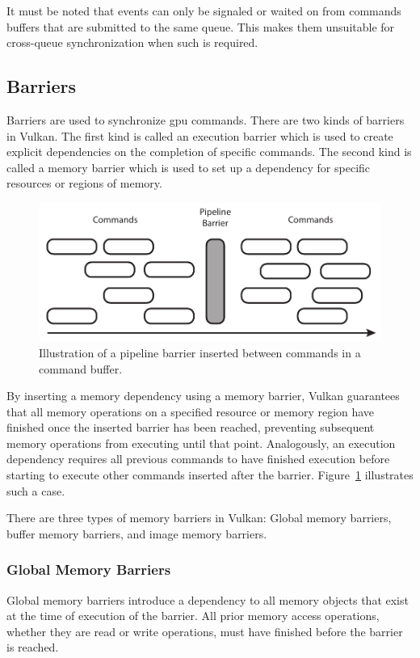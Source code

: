       It must be noted that events can only be signaled or waited on from commands buffers that are submitted to the same queue.
      This makes them unsuitable for cross-queue synchronization when such is required.

    \subsection{Barriers}
    \label{sub:Barriers}
      Barriers are used to synchronize \gls{gpu} commands.
      There are two kinds of barriers in Vulkan.
      The first kind is called an execution barrier which is used to create explicit dependencies on the completion of specific commands.
      The second kind is called a memory barrier which is used to set up a dependency for specific resources or regions of memory.

      \begin{figure}
        \centering
        \includegraphics[width=\textwidth]{Main/Images/PipelineBarrier}
        \caption{Illustration of a pipeline barrier inserted between commands in a command buffer.}
        \label{fig:PipelineBarrier}
      \end{figure}

      By inserting a memory dependency using a memory barrier, Vulkan guarantees that all memory operations on a specified resource or memory region have finished once the inserted barrier has been reached, preventing subsequent memory operations from executing until that point.
      Analogously, an execution dependency requires all previous commands to have finished execution before starting to execute other commands inserted after the barrier.
      Figure~\ref{fig:PipelineBarrier} illustrates such a case.

      There are three types of memory barriers in Vulkan: Global memory barriers, buffer memory barriers, and image memory barriers.

      \subsubsection{Global Memory Barriers}
        Global memory barriers introduce a dependency to all memory objects that exist at the time of execution of the barrier.
        All prior memory access operations, whether they are read or write operations, must have finished before the barrier is reached.

